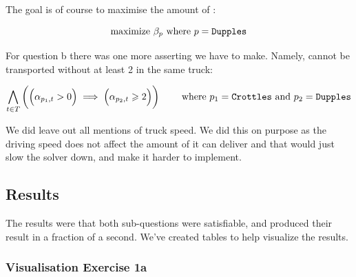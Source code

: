             \noindent The goal is of course to maximise the amount of \Dupples:
            
            \[
                \text{maximize } \beta_p \text{ where $p = \texttt{Dupples}$}
            \]

            \noindent For question b there was one more asserting we have to
            make. Namely, \Crottles cannot be transported without at least 2
            \Dupples\text{ } in the same truck:

            \[
                \bigwedge_{t \in T} \bigg(
                    \Big(
                        \alpha_{p_1,t} > 0
                    \Big) \implies \Big(
                        \alpha_{p_2,t} \geqslant 2
                    \Big)
                \bigg) \qquad 
                    \text{ where $p_1 = \texttt{Crottles}$}
                    \text{ and $p_2 = \texttt{Dupples}$}
            \]

            \noindent We did leave out all mentions of truck speed. We did this
            on purpose as the driving speed does not affect the amount of
            \Dupples\text{ } it can deliver and that would just slow the solver
            down, and make it harder to implement.

    \subsection{Results}
        The results were that both sub-questions were satisfiable, and produced their result in a fraction of a second. We've created
        tables to help visualize the results.

        \subsubsection{Visualisation Exercise 1a}

